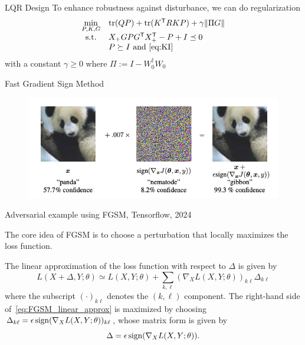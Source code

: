 \documentclass[aspectratio=169, handout, 10pt, hyperref=colorlinks]{beamer}
\begin{document}
\begin{frame}[allowframebreaks]{LQR Design}
To enhance robustness against disturbance, we can do regularization
\begin{equation}\label{eq:prob_reg1}
\begin{array}{cl}
 \displaystyle{\min_{P,K,G}} & \operatorname{tr}(QP)+\operatorname{tr}(K^{\sf T}RKP)+\gamma\|\Pi G\|\\
 {\rm s.t.} & X_+GPG^{\sf T}X_+^{\sf T}-P+I\preceq 0\\
  & P \succeq I\ {\rm and}\ \eqref{eq:KI}\\
\end{array}
\end{equation}
with a constant $\gamma\geq0$ where $\Pi:=I-W_0^{\dagger}W_0$
\end{frame}
\begin{frame}[allowframebreaks]{Fast Gradient Sign Method}
    \begin{figure}
    \centering
    \includegraphics[width=0.8\linewidth]{Images/FGSM.png}
    \end{figure}
    \begin{center}
    \tiny{Adversarial example using FGSM, Tensorflow, 2024}
    \end{center}
    The core idea of FGSM is to choose a perturbation that locally maximizes the loss function.

    The linear approximation of the loss function with respect to $\Delta$ is given by
    \begin{equation}\label{eq:FGSM_linear_approx}
     L(X+\Delta,Y;\theta)\simeq L(X,Y;\theta)+\sum_{k,\ell}(\nabla_{X}L(X,Y;\theta))_{k\ell}\Delta_{k\ell}
    \end{equation}
    where the subscript $(\cdot)_{k\ell}$ denotes the $(k,\ell)$ component.
    The right-hand side of~\eqref{eq:FGSM_linear_approx} is maximized by choosing $\Delta_{k\ell}=\epsilon\,{\rm sign}(\nabla_{X}L(X,Y;\theta))_{k\ell}$, whose matrix form is given by
    \[
     \Delta = \epsilon\, {\rm sign}(\nabla_{X}L(X,Y;\theta)).
    \]
\end{frame}
\end{document}
